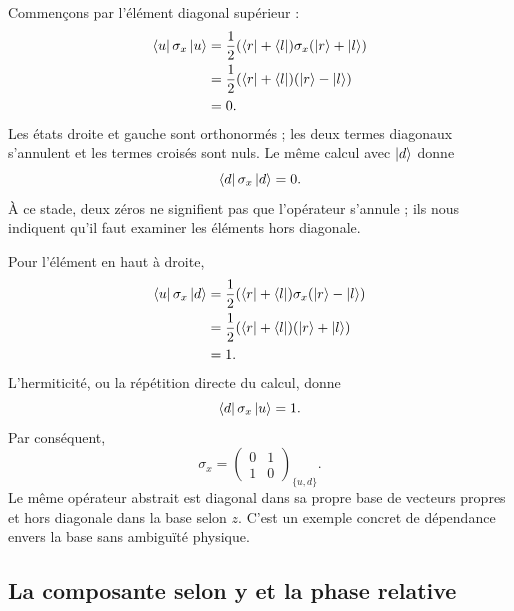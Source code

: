 Commençons par l’élément diagonal supérieur :
\begin{align}
\left\langle u\right\rvert\sigma_x\left\lvert u\right\rangle
 &=\frac12(\left\langle r\right\rvert+\left\langle l\right\rvert)\sigma_x(\left\lvert r\right\rangle+\left\lvert l\right\rangle)\\
 &=\frac12(\left\langle r\right\rvert+\left\langle l\right\rvert)(\left\lvert r\right\rangle-\left\lvert l\right\rangle)\\
 &=0.
\end{align}
Les états droite et gauche sont orthonormés ; les deux termes diagonaux s’annulent et les termes croisés sont nuls. Le même calcul avec \(\left\lvert d\right\rangle\) donne
\[
\left\langle d\right\rvert\sigma_x\left\lvert d\right\rangle=0.
\]
À ce stade, deux zéros ne signifient pas que l’opérateur s’annule ; ils nous indiquent qu’il faut examiner les éléments hors diagonale.

Pour l’élément en haut à droite,
\begin{align}
\left\langle u\right\rvert\sigma_x\left\lvert d\right\rangle
 &=\frac12(\left\langle r\right\rvert+\left\langle l\right\rvert)\sigma_x(\left\lvert r\right\rangle-\left\lvert l\right\rangle)\\
 &=\frac12(\left\langle r\right\rvert+\left\langle l\right\rvert)(\left\lvert r\right\rangle+\left\lvert l\right\rangle)\\
 &=1.
\end{align}
L’hermiticité, ou la répétition directe du calcul, donne
\[
\left\langle d\right\rvert\sigma_x\left\lvert u\right\rangle=1.
\]
Par conséquent,
\begin{equation}
\boxed{
\sigma_x=
\begin{pmatrix}
0&1\\
1&0
\end{pmatrix}_{\{u,d\}}.}
\label{eq:sigma-x}
\end{equation}
Le même opérateur abstrait est diagonal dans sa propre base de vecteurs propres et hors diagonale dans la base selon \(z\). C’est un exemple concret de dépendance envers la base sans ambiguïté physique.

\subsection{La composante selon y et la phase relative}

